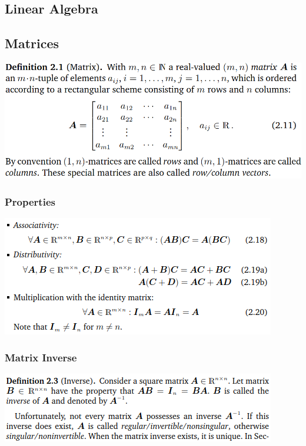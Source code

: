 \documentclass[oneside]{article}
\begin{document}
\begin{multicols}{2}
\section{Linear Algebra}
\subsection{Matrices}
\includegraphics[width=\linewidth]{2.2}
\subsubsection*{Properties}
\includegraphics[width=\linewidth]{2.2_1}
\subsubsection*{Matrix Inverse}
\includegraphics[width=\linewidth]{2.2_2}

\end{multicols}
\end{document}
